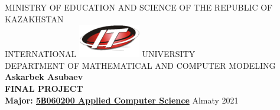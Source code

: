 \begin{titlepage}
    \begin{center}
        \vspace*{1cm}
            
        \normalsize
         MINISTRY OF EDUCATION AND SCIENCE OF THE REPUBLIC OF KAZAKHSTAN\\
\vspace{0.5cm}
                        INTERNATIONAL   \includegraphics{labs/embl.png} UNIVERSITY\\
\vspace{0.5cm}
            DEPARTMENT OF MATHEMATICAL AND COMPUTER MODELING\\
\vspace{4cm}
        \textbf{Askarbek  Asubaev}\\
\vspace{1.5cm}
        \textbf{FINAL PROJECT}\\  
\vspace{3cm}
        \textbf{Major: \underline{5В060200 Applied Computer Science}}
 \vfill
       Almaty 2021
 \vspace{0.8cm}
        
     
            
    \end{center}
\end{titlepage}





